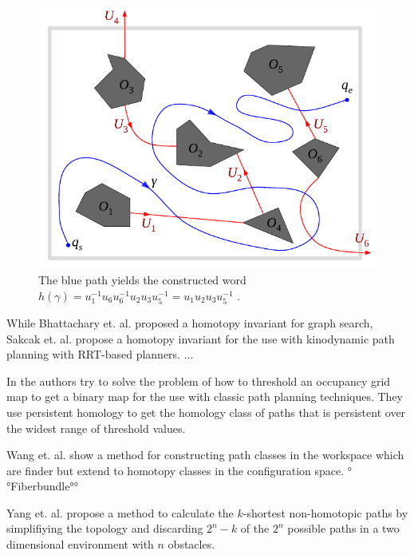 \documentclass[11pt,twocolumn]{article}
\begin{document}
\begin{figure}[h] \centering
  \includegraphics[scale=.4]{word_construction}
  \caption{The blue path yields the constructed word
    \(h(\gamma) = u_{1}^{-1} u_{6} u_{6}^{-1} u_{2} u_{3} u_{5}^{-1} =
    u_{1} u_{2} u_{3} u_{5}^{-1}\)
    \cite{bhattacharyaPathHomotopyInvariants2018}.}
  \label{fig:word-construction}
\end{figure}

While Bhattachary et. al. proposed a homotopy invariant for graph
search, Sakcak et. al. \cite{sakcakHomotopyAwareKinodynamic2019}
propose a homotopy invariant for the use with kinodynamic path
planning with RRT-based planners. ...

In \cite{bhattacharyaPersistentHomologyPath2015} the authors try to
solve the problem of how to threshold an occupancy grid map to get a
binary map for the use with classic path planning techniques. They use
persistent homology to get the homology class of paths that is
persistent over the widest range of threshold values.

Wang et. al. \cite{wangConstructingFinerThen2022} show a method for
constructing path classes in the workspace which are finder but extend
to homotopy classes in the configuration space. °°Fiberbundle°°

Yang et. al. \cite{yangEfficientSearchShortest2022} propose a method
to calculate the \(k\)-shortest non-homotopic paths by simplifiying
the topology and discarding \(2^{n} - k\) of the \(2^{n}\) possible
paths in a two dimensional environment with \(n\) obstacles.
\end{document}
